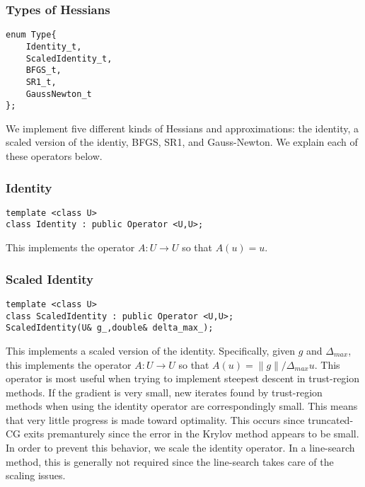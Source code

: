 \documentclass{article}
\begin{document}
\subsubsection{Types of Hessians}

\begin{flushleft}
\begin{lstlisting}
enum Type{
    Identity_t,     
    ScaledIdentity_t,
    BFGS_t,          
    SR1_t,            
    GaussNewton_t      
};
\end{lstlisting}
\end{flushleft}

We implement five different kinds of Hessians and approximations: the identity, a scaled version of the identiy, BFGS, SR1, and Gauss-Newton.  We explain each of these operators below.

\subsubsection{Identity}

\begin{flushleft}
\begin{lstlisting}
template <class U>
class Identity : public Operator <U,U>; 
\end{lstlisting}
\end{flushleft}

This implements the operator $A:U\rightarrow U$ so that $A(u)=u$.

\subsubsection{Scaled Identity}

\begin{flushleft}
\begin{lstlisting}
template <class U>
class ScaledIdentity : public Operator <U,U>;
ScaledIdentity(U& g_,double& delta_max_);
\end{lstlisting}
\end{flushleft}

This implements a scaled version of the identity.  Specifically, given $g$ and $\Delta_{max}$, this implements the operator $A:U\rightarrow U$ so that $A(u)=\|g\|/\Delta_{max} u$.  This operator is most useful when trying to implement steepest descent in trust-region methods.  If the gradient is very small, new iterates found by trust-region methods when using the identity operator are correspondingly small.  This means that very little progress is made toward optimality.  This occurs since truncated-CG exits premanturely since the error in the Krylov method appears to be small.  In order to prevent this behavior, we scale the identity operator.  In a line-search method, this is generally not required since the line-search takes care of the scaling issues.
\end{document}
